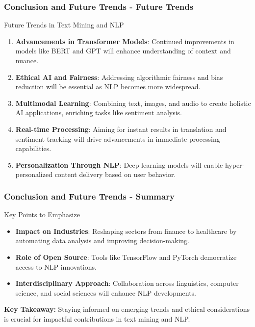 \documentclass[aspectratio=169]{beamer}
\begin{document}
\begin{frame}[fragile]
    \frametitle{Conclusion and Future Trends - Future Trends}
    
    \begin{block}{Future Trends in Text Mining and NLP}
        \begin{enumerate}
            \item \textbf{Advancements in Transformer Models}: Continued improvements in models like BERT and GPT will enhance understanding of context and nuance.
            
            \item \textbf{Ethical AI and Fairness}: Addressing algorithmic fairness and bias reduction will be essential as NLP becomes more widespread.
            
            \item \textbf{Multimodal Learning}: Combining text, images, and audio to create holistic AI applications, enriching tasks like sentiment analysis.
            
            \item \textbf{Real-time Processing}: Aiming for instant results in translation and sentiment tracking will drive advancements in immediate processing capabilities.
            
            \item \textbf{Personalization Through NLP}: Deep learning models will enable hyper-personalized content delivery based on user behavior.
        \end{enumerate}
    \end{block}
\end{frame}

\begin{frame}[fragile]
    \frametitle{Conclusion and Future Trends - Summary}
    
    \begin{block}{Key Points to Emphasize}
        \begin{itemize}
            \item \textbf{Impact on Industries}: Reshaping sectors from finance to healthcare by automating data analysis and improving decision-making.
            \item \textbf{Role of Open Source}: Tools like TensorFlow and PyTorch democratize access to NLP innovations.
            \item \textbf{Interdisciplinary Approach}: Collaboration across linguistics, computer science, and social sciences will enhance NLP developments.
        \end{itemize}
    \end{block}
    
    \vspace{0.5cm}
    \textbf{Key Takeaway:} Staying informed on emerging trends and ethical considerations is crucial for impactful contributions in text mining and NLP.
\end{frame}
\end{document}
